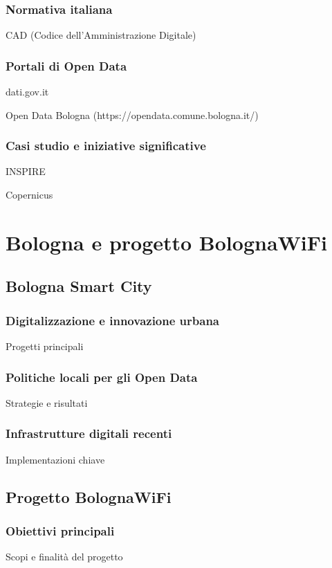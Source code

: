 \subsubsection{Normativa italiana}
CAD (Codice dell'Amministrazione Digitale)

\subsubsection{Portali di Open Data}
dati.gov.it

Open Data Bologna (https://opendata.comune.bologna.it/)

\subsubsection{Casi studio e iniziative significative}
INSPIRE

Copernicus


\section{Bologna e progetto BolognaWiFi}  %
\subsection{Bologna Smart City}
\subsubsection{Digitalizzazione e innovazione urbana}
Progetti principali

\subsubsection{Politiche locali per gli Open Data}
Strategie e risultati

\subsubsection{Infrastrutture digitali recenti}
Implementazioni chiave

\subsection{Progetto BolognaWiFi}
\subsubsection{Obiettivi principali}
Scopi e finalità del progetto

